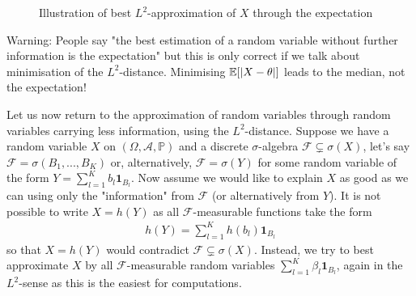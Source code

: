 \begin{figure}[h]
\begin{center}
  \vspace{-3mm}
  \caption*{Illustration of best $L^2$-approximation of $X$ through the expectation}
\end{center}
\end{figure}
\begin{lwarnhinweis}
Warning: People say "{}the best estimation of a random variable without further information is the expectation"{} but this is only correct if we talk about minimisation of the $L^2$-distance. Minimising $\mathbb{E}[|X-\theta|]$ leads to the median, not the expectation! \smallskip
\end{lwarnhinweis}

Let us now return to the approximation of random variables through random variables carrying less information, using the $L^2$-distance. Suppose we have a random variable $X$ on $(\Omega, \mathcal A, \mathbb P)$ and a discrete $\sigma$-algebra $\mathcal F\subsetneq \sigma(X)$, let's say $\mathcal F=\sigma(B_1,...,B_K)$ or, alternatively, $\mathcal F=\sigma(Y)$ for some random variable of the form $Y=\sum_{l=1}^K b_l \mathbf 1_{B_l}$. Now assume  we would like to explain $X$ as good as we can using only the "{}information"{} from $\mathcal F$ (or alternatively from $Y$). It is not possible to write $X=h(Y)$ as all $\mathcal F$-measurable functions take the form
\begin{align*}
	h(Y)= \sum_{l=1}^K h(b_l) \mathbf 1_{B_l}
\end{align*}
so that $X=h(Y)$ would contradict $\mathcal F\subsetneq \sigma(X)$. Instead, we try to best approximate $X$ by all $\mathcal F$-measurable random variables $\sum_{l=1}^K \beta_l \mathbf 1_{B_l}$, again in the $L^2$-sense as this is the easiest for computations.



